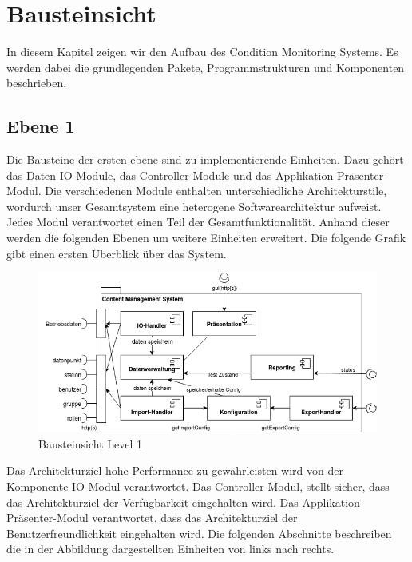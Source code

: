 \chapter{Bausteinsicht}
In diesem Kapitel zeigen wir den Aufbau des Condition Monitoring Systems. Es werden dabei die grundlegenden Pakete, Programmstrukturen und Komponenten beschrieben.
\section{Ebene 1}
Die Bausteine der ersten ebene sind zu implementierende Einheiten. Dazu gehört das Daten IO-Module, das Controller-Module und das Applikation-Präsenter-Modul. 
Die verschiedenen Module enthalten unterschiedliche Architekturstile, wordurch unser Gesamtsystem eine heterogene Softwarearchitektur aufweist. Jedes Modul verantwortet einen Teil der Gesamtfunktionalität. Anhand dieser werden die folgenden Ebenen um weitere Einheiten erweitert. Die folgende Grafik gibt einen ersten Überblick über das System.
\begin{figure}[h]
	\centering
	\includegraphics[width=1.0\textwidth]{Graphics/bausteinansicht_ebene_1.png}
	\caption{Bausteinsicht Level 1}
	\label{fig:bausteinsichtlvl1}
\end{figure}

Das Architekturziel hohe Performance zu gewährleisten wird von der Komponente IO-Modul verantwortet.
Das Controller-Modul, stellt sicher, dass das Architekturziel der Verfügbarkeit eingehalten wird. 
Das Applikation-Präsenter-Modul verantwortet, dass das Architekturziel der Benutzerfreundlichkeit eingehalten wird.
Die folgenden Abschnitte beschreiben die in der Abbildung dargestellten Einheiten von links nach rechts.
\clearpage
 

